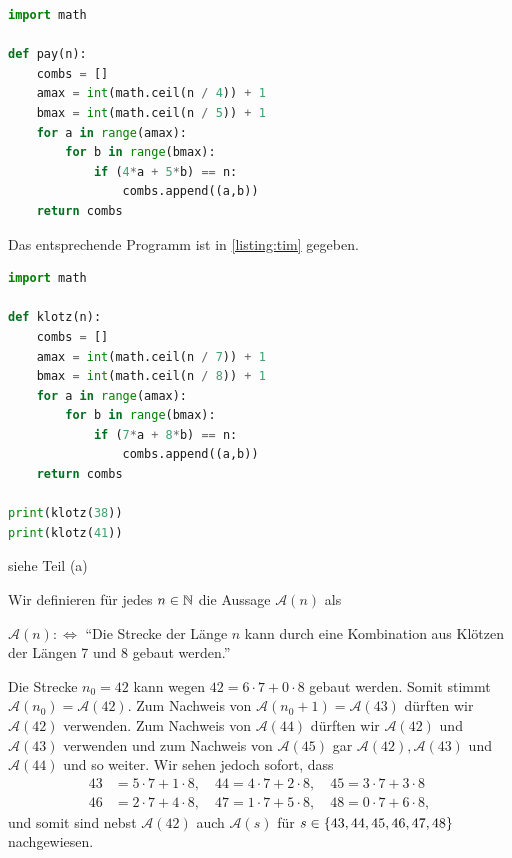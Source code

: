 \begin{myanswer}[myexercise:0208]
	\begin{lstlisting}[language=Python,caption=Dollar-Betrag auszahlen]
import math

def pay(n):
    combs = []
    amax = int(math.ceil(n / 4)) + 1
    bmax = int(math.ceil(n / 5)) + 1
    for a in range(amax):
        for b in range(bmax):
            if (4*a + 5*b) == n:
                combs.append((a,b))
    return combs
\end{lstlisting}
\end{myanswer}
\clearpage
\begin{myanswer}[myexercise:0210]
	\begin{aenum}
		\item Das entsprechende Programm ist in \cref{listing:tim} gegeben.
		\begin{lstlisting}[language=Python,caption=Bauklötze,label=listing:tim]
import math

def klotz(n):
    combs = []
    amax = int(math.ceil(n / 7)) + 1
    bmax = int(math.ceil(n / 8)) + 1
    for a in range(amax):
        for b in range(bmax):
            if (7*a + 8*b) == n:
                combs.append((a,b))
    return combs

print(klotz(38))
print(klotz(41))
\end{lstlisting}
		\item siehe Teil (a)
		\item
		Wir definieren für jedes $n\in\mathbb{N}$ die Aussage $\mathcal{A}(n)$ als
		\begin{center}
			$\mathcal{A}(n) :\iff $ \enquote{Die Strecke der Länge $n$ kann durch eine Kombination aus Klötzen der Längen 7 und 8 gebaut werden.}
		\end{center}
		Die Strecke $n_0 = 42$ kann wegen $42 = 6\cdot 7 + 0\cdot 8$ gebaut werden. Somit stimmt $\mathcal{A}(n_0)=\mathcal{A}(42)$. Zum Nachweis von $\mathcal{A}(n_0+1)=\mathcal{A}(43)$ dürften wir $\mathcal{A}(42)$ verwenden. Zum Nachweis von $\mathcal{A}(44)$ dürften wir $\mathcal{A}(42)$ und $\mathcal{A}(43)$ verwenden und zum Nachweis von $\mathcal{A}(45)$ gar $\mathcal{A}(42), \mathcal{A}(43)$ und $\mathcal{A}(44)$ und so weiter. Wir sehen jedoch sofort, dass
		\begin{align*}
			43 & = 5\cdot 7 + 1\cdot 8, \quad 44 = 4\cdot 7 + 2\cdot 8, \quad 45 = 3\cdot 7 + 3\cdot 8  \\
			46 & = 2\cdot 7 + 4\cdot 8, \quad 47 = 1\cdot 7 + 5\cdot 8, \quad 48 = 0\cdot 7 + 6\cdot 8,
		\end{align*}
		und somit sind nebst $\mathcal{A}(42)$ auch $\mathcal{A}(s)$ für $s\in\left\{43,44,45,46,47,48\right\}$ nachgewiesen.


\end{aenum}
\end{myanswer}
